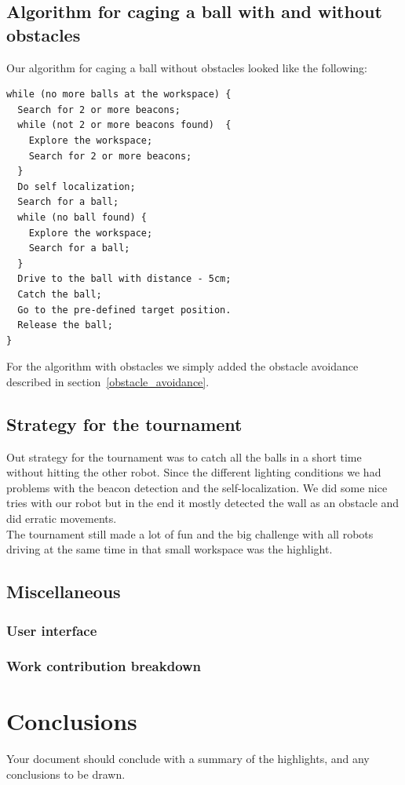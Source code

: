 \documentclass[703030]{iisreport}
\begin{document}
\subsection{Algorithm for caging a ball with and without obstacles}
Our algorithm for caging a ball without obstacles looked like the following:

\begin{lstlisting}[mathescape]
while (no more balls at the workspace) {
  Search for 2 or more beacons;
  while (not 2 or more beacons found)  {
    Explore the workspace;
    Search for 2 or more beacons;
  }
  Do self localization;
  Search for a ball;
  while (no ball found) {
    Explore the workspace;
    Search for a ball;
  }
  Drive to the ball with distance - 5cm;
  Catch the ball;
  Go to the pre-defined target position.
  Release the ball;
}
\end{lstlisting}

\noindent For the algorithm with obstacles we simply added the obstacle avoidance described
in section~\ref{obstacle_avoidance}.

\subsection{Strategy for the tournament}
Out strategy for the tournament was to catch all the balls in a short time without
hitting the other robot. Since the different lighting conditions we had problems with
the beacon detection and the self-localization. We did some nice tries with our robot but
in the end it mostly detected the wall as an obstacle and did erratic movements. \\
The tournament still made a lot of fun and the big challenge with all robots driving
at the same time in that small workspace was the highlight.

\subsection{Miscellaneous}
  \subsubsection{User interface}
  \subsubsection{Work contribution breakdown}


\section{Conclusions}

Your document should conclude with a summary of the highlights, and any conclusions to be drawn.


\end{document}
